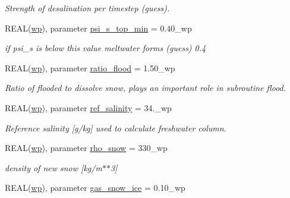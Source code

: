 \begin{DoxyCompactItemize}
\begin{DoxyCompactList}\small\item\em Strength of desalination per timestep (guess). \item\end{DoxyCompactList}\item 
REAL(\hyperlink{namespacemo__parameters_a41be20bed1dcec244405328deaaffe30}{wp}), parameter \hyperlink{namespacemo__parameters_aad3c0bd73579bfd1abca40b80ed51334}{psi\_\-s\_\-top\_\-min} = 0.40\_\-wp
\begin{DoxyCompactList}\small\item\em if psi\_\-s is below this value meltwater forms (guess) 0.4 \item\end{DoxyCompactList}\item 
REAL(\hyperlink{namespacemo__parameters_a41be20bed1dcec244405328deaaffe30}{wp}), parameter \hyperlink{namespacemo__parameters_a539e9e515a9154116d2c2f53f4153518}{ratio\_\-flood} = 1.50\_\-wp
\begin{DoxyCompactList}\small\item\em Ratio of flooded to dissolve snow, plays an important role in subroutine flood. \item\end{DoxyCompactList}\item 
REAL(\hyperlink{namespacemo__parameters_a41be20bed1dcec244405328deaaffe30}{wp}), parameter \hyperlink{namespacemo__parameters_a2ed9bfc96e43a2ccb5fc932c202bcee1}{ref\_\-salinity} = 34.\_\-wp
\begin{DoxyCompactList}\small\item\em Reference salinity \mbox{[}g/kg\mbox{]} used to calculate freshwater column. \item\end{DoxyCompactList}\item 
REAL(\hyperlink{namespacemo__parameters_a41be20bed1dcec244405328deaaffe30}{wp}), parameter \hyperlink{namespacemo__parameters_aca92cfe6ef280bfaccdfefb83e06f114}{rho\_\-snow} = 330\_\-wp
\begin{DoxyCompactList}\small\item\em density of new snow \mbox{[}kg/m$\ast$$\ast$3\mbox{]} \item\end{DoxyCompactList}\item 
REAL(\hyperlink{namespacemo__parameters_a41be20bed1dcec244405328deaaffe30}{wp}), parameter \hyperlink{namespacemo__parameters_a37ad2fc4cadab9eda79a630a8744079e}{gas\_\-snow\_\-ice} = 0.10\_\-wp

\end{DoxyCompactItemize}
